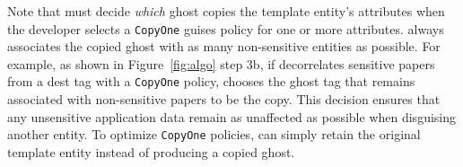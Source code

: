 Note that \sys must decide \emph{which} ghost copies the template entity's attributes when the
developer selects a \texttt{CopyOne} guises policy for one or more attributes. \sys always
associates the copied ghost with as many non-sensitive entities as possible. For example, as shown
in Figure~\ref{fig:algo} step 3b, if \sys decorrelates sensitive papers from a dest tag with a
\texttt{CopyOne} policy, \sys chooses the ghost tag that remains associated with non-sensitive
papers to be the copy. This decision ensures that any unsensitive application
data remain as unaffected as possible when disguising another entity.
To optimize
\texttt{CopyOne} policies, \sys can simply retain the original template entity instead of producing
a copied ghost.
